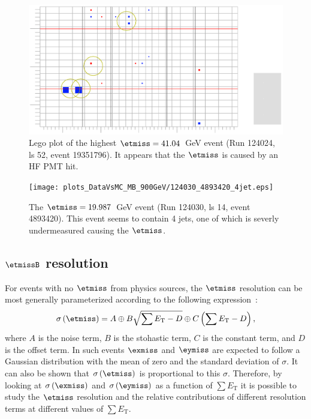 \begin{figure}[h!]
  \includegraphics[width=12cm]{plots_DataVsMC_MB_900GeV/124024_19351796_MET41GeV.eps}
  \caption{Lego plot of the highest $\etmiss=41.04$~GeV event (Run 124024, ls 52, event 19351796). It appears
    that the $\etmiss$ is caused by an HF PMT hit.
    \label{fig:DataVsMC_MB_900_evd1}}
\end{figure}

\begin{figure}[h!]
  \texttt{[image: plots\_DataVsMC\_MB\_900GeV/124030\_4893420\_4jet.eps]}
  \caption{The $\etmiss=19.987$~GeV event (Run 124030, ls
    14, event 4893420). This event seems to contain 4 jets, one of which
    is severly undermeasured causing the $\etmiss$.
    \label{fig:DataVsMC_MB_900_evd3}}
\end{figure}


\clearpage

\subsection[$\etmiss$ resolution]{$\etmissB$ resolution} \label{sc:DataVsMCMB900Res}

For events with no $\etmiss$ from physics sources, the $\etmiss$ resolution can be most generally parameterized
according to the following expression~\cite{CMS:AN_2007_041}:
\begin{equation}
  \sigma\left(\etmiss\right)=A \oplus B\sqrt{\sum E_\text{T}-D} \oplus C\left(\sum E_\text{T}-D\right),
  \label{eq:MET_sigma}
\end{equation}
where $A$ is the noise term, $B$ is the stohastic term, $C$ is the constant term, and $D$ is the offset term. In such events
$\exmiss$ and $\eymiss$ are expected to follow a Gaussian distribution with the mean of zero and the standard deviation
of $\sigma$. It can also be shown that $\sigma\left(\etmiss\right)$ is proportional to this $\sigma$. Therefore,
by looking at $\sigma\left(\exmiss\right)$ and $\sigma\left(\eymiss\right)$ as a function of $\sum E_\text{T}$ it is possible to
study the $\etmiss$ resolution and the relative contributions of different resolution terms at different values of $\sum E_\text{T}$.

